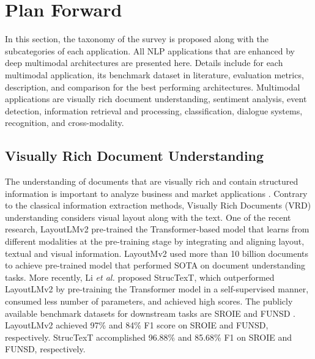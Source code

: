 \documentclass[conference]{IEEEtran}
\begin{document}
\section{Plan Forward}
In this section, the taxonomy of the survey is proposed along with the subcategories of each application. All NLP applications that are enhanced by deep multimodal architectures are presented here. Details include for each multimodal application, its benchmark dataset in literature, evaluation metrics, description, and comparison for the best performing architectures. Multimodal applications are visually rich document understanding, sentiment analysis, event detection, information retrieval and processing, classification, dialogue systems, recognition, and cross-modality.      

\subsection{Visually Rich Document Understanding}
The understanding of documents that are visually rich and contain structured information is important to analyze business and market applications \cite{im2021self}. Contrary to the classical information extraction methods, Visually Rich Documents (VRD) understanding considers visual layout along with the text. One of the recent research, LayoutLMv2 \cite{xu2020layoutlmv2}  pre-trained the Transformer-based model that learns from different modalities at the pre-training stage by integrating and aligning layout, textual and visual information. LayoutMv2 used more than 10 billion documents to achieve pre-trained model that performed SOTA on document understanding tasks. More recently, Li \textit{et al.} \cite{li2021structext} proposed StrucTexT, which outperformed LayoutLMv2 by pre-training the Transformer model in a self-supervised manner, consumed less number of parameters, and achieved high scores. The publicly available benchmark datasets for downstream tasks are SROIE \cite{huang2019icdar2019}  and FUNSD \cite{jaume2019funsd}. LayoutLMv2 achieved 97\% and 84\% F1 score on SROIE and FUNSD, respectively. StrucTexT accomplished 96.88\% and 85.68\% F1 on SROIE and FUNSD, respectively.  
\end{document}
